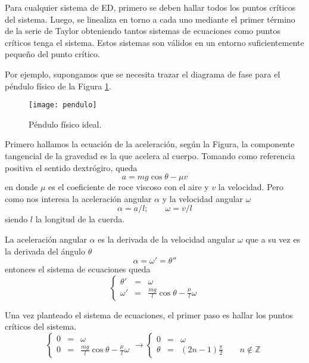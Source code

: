 Para cualquier  sistema de ED, primero se deben hallar todos los puntos críticos del sistema. Luego, se linealiza en torno a cada uno mediante el primer término de la serie de Taylor obteniendo tantos sistemas de ecuaciones como puntos críticos tenga el sistema.
Estos sistemas son válidos en un entorno suficientemente pequeño del punto crítico.

Por ejemplo, supongamos que se necesita trazar el diagrama de fase para el péndulo físico de la Figura \ref{fig:pendulo}.
%
\begin{figure}[htpb]
	\centering
	\texttt{[image: pendulo]}
	\caption{Péndulo físico ideal.}
	\label{fig:pendulo}
\end{figure}

Primero hallamos la ecuación de la aceleración, según la Figura, la componente tangencial de la gravedad es la que acelera al cuerpo.
Tomando como referencia positiva el sentido dextrógiro, queda
%
\begin{equation}
a=mg\cos\theta - \mu v \nonumber
\end{equation}
%
en donde $\mu$ es el coeficiente de roce viscoso con el aire y $v$ la velocidad. Pero como nos interesa la aceleración angular $\alpha$ y la velocidad angular $\omega$
%
\begin{equation}
\alpha=a/l; \qquad \omega=v/l \nonumber
\end{equation}
%
siendo $l$ la longitud de la cuerda.

La aceleración angular $\alpha$ es la derivada de la velocidad angular $\omega$ que a su vez es la derivada del ángulo $\theta$
%
\begin{equation}
\alpha = \omega' = \theta'' \nonumber
\end{equation}
%
entonces el sistema de ecuaciones queda
%
\begin{equation}
\left \{
\begin{array}{rcl}
\theta' &=& \omega\\
\omega' &=& \frac{mg}{l}\cos{\theta}-\frac{\mu}{l}\omega
\end{array}
\right. \nonumber
\end{equation}

Una vez planteado el sistema de ecuaciones, el primer paso es hallar los puntos críticos del sistema.
%
\begin{equation}
\left \{
\begin{array}{rcl}
0 &=& \omega\\
0 &=& \frac{mg}{l}\cos{\theta}-\frac{\mu}{l}\omega
\end{array}
\right.
\longrightarrow
\left \{
\begin{array}{rcl}
0 &=& \omega\\
\theta &=& (2n-1)\frac{\pi}{2} \qquad n\notin\mathbb{Z}
\end{array}
\right.
\nonumber
\end{equation}


